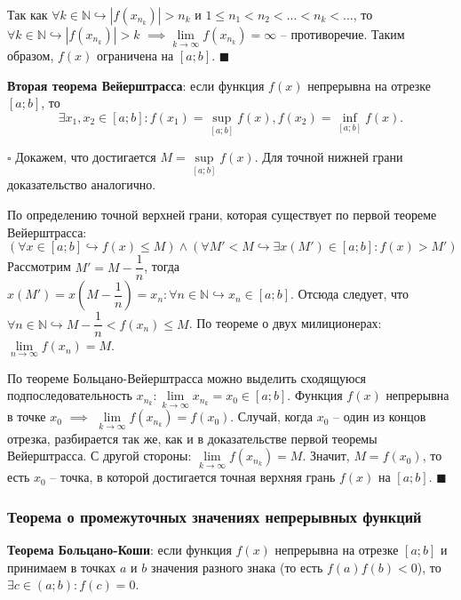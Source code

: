 \documentclass[12pt, a4paper, reqno]{article}
\begin{document}
    Так как $\forall k\in\mathbb{N} \hookrightarrow|f(x_{n_k})| > n_k$ и
    $1\leq n_1 < n_2 < ... < n_k < ...$, то $\forall k\in\mathbb{N}\hookrightarrow
    |f(x_{n_k})| > k$ $\implies \lim\limits_{k\to\infty} f(x_{n_k}) = \infty$ -- противоречие. Таким
    образом, $f(x)$ ограничена на $[a; b]$. $\blacksquare$

    \textbf{Вторая теорема Вейерштрасса}: если функция $f(x)$ непрерывна на отрезке $[a; b]$, то
    \begin{equation*}
        \exists x_1, x_2\in[a; b]: f(x_1) = \sup\limits_{[a; b]} f(x), f(x_2) = \inf\limits_{[a; b]} f(x).
    \end{equation*}

    $\square$ Докажем, что достигается $M = \sup\limits_{[a; b]} f(x)$. Для точной нижней грани
    доказательство аналогично.

    По определению точной верхней грани, которая существует по первой теореме Вейерштрасса:
    \begin{equation*}
        (\forall x\in[a; b]\hookrightarrow f(x)\leq M)\wedge(\forall M' < M\hookrightarrow
        \exists x(M')\in[a; b]: f(x) > M')
    \end{equation*}
    Рассмотрим $M' = M - \dfrac{1}{n}$, тогда $x(M') = x\left(M - \dfrac{1}{n}\right) = x_n: \forall
    n\in\mathbb{N}\hookrightarrow x_n\in[a; b]$. Отсюда следует, что $\forall n\in\mathbb{N}
    \hookrightarrow M - \dfrac{1}{n} < f(x_n) \leq M$. По теореме о двух милиционерах:
    $\lim\limits_{n\to\infty} f(x_n) = M$.

    По теореме Больцано-Вейерштрасса можно выделить сходящуюся подпоследовательность $x_{n_k}:
    \lim\limits_{k\to\infty} x_{n_k} = x_0\in[a; b]$. Функция $f(x)$ непрерывна в точке $x_0$
    $\implies$ $\lim\limits_{k\to\infty}f(x_{n_k}) = f(x_0)$. Случай, когда $x_0$ -- один из концов
    отрезка, разбирается так же, как и в доказательстве первой теоремы Вейерштрасса. С другой
    стороны: $\lim\limits_{k\to\infty}f(x_{n_k}) = M$. Значит, $M = f(x_0)$, то есть $x_0$ -- точка,
    в которой достигается точная верхняя грань $f(x)$ на $[a; b]$. $\blacksquare$

\subsubsection{Теорема о промежуточных значениях непрерывных функций}

    \textbf{Теорема Больцано-Коши}: если функция $f(x)$ непрерывна на отрезке $[a; b]$ и принимаем в
    точках $a$ и $b$ значения разного знака (то есть $f(a)f(b) < 0$), то $\exists c\in(a; b):
    f(c) = 0$.
\end{document}
